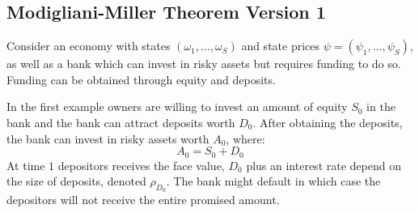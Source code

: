 \documentclass[10pt,a4paper]{article}
\begin{document}
    \subsection{Modigliani-Miller Theorem Version 1}
        Consider an economy with states $(\omega_{1}, \dots, \omega_{S})$ and state prices $\psi = (\psi_{1}, \dots, \psi_{S})$, as well as a bank which can invest in risky assets but requires funding to do so. Funding can be obtained through equity and deposits. 

        In the first example owners are willing to invest an amount of equity $S_{0}$ in the bank and the bank can attract deposits worth $D_{0}$. After obtaining the deposits, the bank can invest in risky assets worth $A_{0}$, where:
            \begin{equation}
                A_{0} = S_{0} + D_{0}
            \end{equation}
        At time $1$ depositors receives the face value, $D_{0}$ plus an interest rate depend on the size of deposits, denoted $\rho_{D_{0}}$. The bank might default in which case the depositors will not receive the entire promised amount. 
\end{document}
